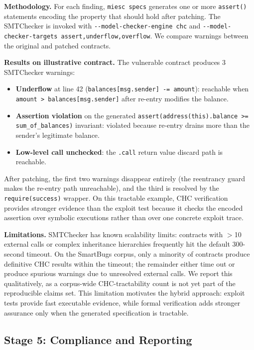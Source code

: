 \documentclass[conference]{IEEEtran}
\begin{document}
\textbf{Methodology.} For each finding, \texttt{miesc specs} generates one or more \texttt{assert()} statements encoding the property that should hold after patching. The SMTChecker is invoked with \texttt{-{}-model-checker-engine chc} and \texttt{-{}-model-checker-targets assert,underflow,overflow}. We compare warnings between the original and patched contracts.

\textbf{Results on illustrative contract.} The vulnerable contract produces 3 SMTChecker warnings:
\begin{itemize}
    \item \textbf{Underflow} at line 42 (\texttt{balances[msg.sender] -= amount}): reachable when \texttt{amount > balances[msg.sender]} after re-entry modifies the balance.
    \item \textbf{Assertion violation} on the generated \texttt{assert(address(this).balance >= sum\_of\_balances)} invariant: violated because re-entry drains more than the sender's legitimate balance.
    \item \textbf{Low-level call unchecked}: the \texttt{.call} return value discard path is reachable.
\end{itemize}

After patching, the first two warnings disappear entirely (the reentrancy guard makes the re-entry path unreachable), and the third is resolved by the \texttt{require(success)} wrapper. On this tractable example, CHC verification provides stronger evidence than the exploit test because it checks the encoded assertion over symbolic executions rather than over one concrete exploit trace.

\textbf{Limitations.} SMTChecker has known scalability limits: contracts with $>$10 external calls or complex inheritance hierarchies frequently hit the default 300-second timeout. On the SmartBugs corpus, only a minority of contracts produce definitive CHC results within the timeout; the remainder either time out or produce spurious warnings due to unresolved external calls. We report this qualitatively, as a corpus-wide CHC-tractability count is not yet part of the reproducible claims set. This limitation motivates the hybrid approach: exploit tests provide fast executable evidence, while formal verification adds stronger assurance only when the generated specification is tractable.

\subsection{Stage 5: Compliance and Reporting}
\end{document}
